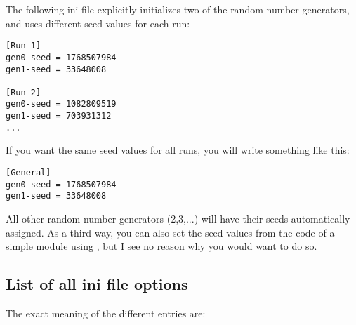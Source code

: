 The following ini file explicitly initializes two of the random 
number generators, and uses different seed values for each run:

\begin{Verbatim}
[Run 1]
gen0-seed = 1768507984
gen1-seed = 33648008

[Run 2]
gen0-seed = 1082809519
gen1-seed = 703931312
...
\end{Verbatim}


If you want the same seed values for all runs, you will write 
something like this:

\begin{Verbatim}
[General]
gen0-seed = 1768507984
gen1-seed = 33648008
\end{Verbatim}


All other random number generators (2,3,...) will have their seeds
automatically assigned.  As a third way, you can also set the seed
values from the code of a simple module using
, but I see no reason why you would want to do
so.





\subsection{List of all ini file options}

The exact meaning of the different entries are:


